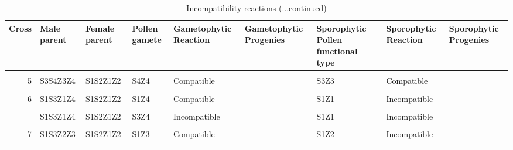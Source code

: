 \documentclass[11pt,ignorenonframetext,aspectratio=169]{beamer}
\begin{document}
\begin{frame}{}
\protect\hypertarget{section-7}{}
\begin{table}

\caption{\label{tab:si-comparison-reaction2}Incompatibility reactions (...continued)}
\centering
\fontsize{6}{8}\selectfont
\begin{tabular}[t]{r>{\raggedright\arraybackslash}p{4em}>{\raggedright\arraybackslash}p{4em}>{\raggedright\arraybackslash}p{4em}>{\raggedright\arraybackslash}p{6em}>{\raggedright\arraybackslash}p{8em}>{\raggedright\arraybackslash}p{8em}>{\raggedright\arraybackslash}p{6em}>{\raggedright\arraybackslash}p{8em}}
\toprule
Cross & Male parent & Female parent & Pollen gamete & Gametophytic Reaction & Gametophytic Progenies & Sporophytic Pollen functional type & Sporophytic Reaction & Sporophytic Progenies\\
\midrule
\cellcolor{gray!6}{5} & \cellcolor{gray!6}{S3S4Z3Z4} & \cellcolor{gray!6}{S1S2Z1Z2} & \cellcolor{gray!6}{S4Z3} & \cellcolor{gray!6}{Compatible} & \cellcolor{gray!6}{} & \cellcolor{gray!6}{S3Z3} & \cellcolor{gray!6}{Compatible} & \cellcolor{gray!6}{}\\
5 & S3S4Z3Z4 & S1S2Z1Z2 & S4Z4 & Compatible &  & S3Z3 & Compatible & \\
\cellcolor{gray!6}{6} & \cellcolor{gray!6}{S1S3Z1Z4} & \cellcolor{gray!6}{S1S2Z1Z2} & \cellcolor{gray!6}{S1Z1} & \cellcolor{gray!6}{Incompatible} & \cellcolor{gray!6}{} & \cellcolor{gray!6}{S1Z1} & \cellcolor{gray!6}{Incompatible} & \cellcolor{gray!6}{}\\
6 & S1S3Z1Z4 & S1S2Z1Z2 & S1Z4 & Compatible &  & S1Z1 & Incompatible & \\
\cellcolor{gray!6}{6} & \cellcolor{gray!6}{S1S3Z1Z4} & \cellcolor{gray!6}{S1S2Z1Z2} & \cellcolor{gray!6}{S3Z1} & \cellcolor{gray!6}{Compatible} & \cellcolor{gray!6}{} & \cellcolor{gray!6}{S1Z1} & \cellcolor{gray!6}{Incompatible} & \cellcolor{gray!6}{}\\
\addlinespace
6 & S1S3Z1Z4 & S1S2Z1Z2 & S3Z4 & Incompatible &  & S1Z1 & Incompatible & \\
\cellcolor{gray!6}{7} & \cellcolor{gray!6}{S1S3Z2Z3} & \cellcolor{gray!6}{S1S2Z1Z2} & \cellcolor{gray!6}{S1Z2} & \cellcolor{gray!6}{Incompatible} & \cellcolor{gray!6}{} & \cellcolor{gray!6}{S1Z2} & \cellcolor{gray!6}{Incompatible} & \cellcolor{gray!6}{}\\
7 & S1S3Z2Z3 & S1S2Z1Z2 & S1Z3 & Compatible &  & S1Z2 & Incompatible & \\
\cellcolor{gray!6}{7} & \cellcolor{gray!6}{S1S3Z2Z3} & \cellcolor{gray!6}{S1S2Z1Z2} & \cellcolor{gray!6}{S3Z2} & \cellcolor{gray!6}{Compatible} & \cellcolor{gray!6}{} & \cellcolor{gray!6}{S1Z2} & \cellcolor{gray!6}{Incompatible} & \cellcolor{gray!6}{}\\

\end{tabular}
\end{table}
\end{frame}
\end{document}
